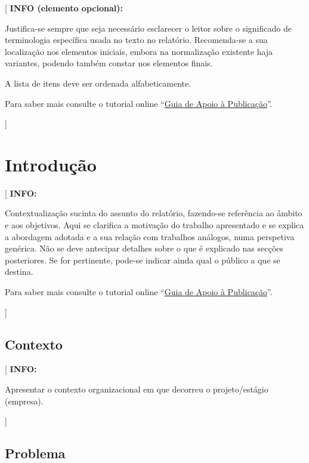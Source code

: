 \documentclass[11pt,a4paper]{report}
\newenvironment{info}[1]{\vspace*{6mm}\color{blue}[ \textbf{INFO:} \begin{em} #1}
                        {\vspace*{3mm}\end{em} ]}
\newenvironment{infoopt}[1]{\vspace*{6mm}\color{blue}[ \textbf{INFO (elemento opcional):} \begin{em} #1}
                        {\vspace*{3mm}\end{em} ]}
\begin{document}
\begin{infoopt}
Justifica-se sempre que seja necessário esclarecer o leitor sobre o
significado de terminologia específica usada no texto no relatório.
Recomenda-se a sua localização nos elementos iniciais, embora na
normalização existente haja variantes, podendo também constar nos
elementos finais.

A lista de itens deve ser ordenada alfabeticamente.

Para saber mais consulte o tutorial online 
``\href{https://docs.google.com/document/d/1TDC1behVq8x7fQL4CcPEEh_np5GXviJevQxnQ9gbiJs/edit}
{Guia de Apoio à Publicação}''.
\end{infoopt}


\chapter{Introdução}

\pagestyle{fancy}
\setcounter{page}{1}

\begin{info}
Contextualização sucinta do assunto do relatório, fazendo-se
referência ao âmbito e aos objetivos.
Aqui se clarifica a motivação do trabalho apresentado e se explica a
abordagem adotada e a sua relação com trabalhos análogos, numa
perspetiva genérica.
Não se deve antecipar detalhes sobre o que é explicado nas secções
posteriores. 
Se for pertinente, pode-se indicar ainda qual o público a que se
destina.

Para saber mais consulte o tutorial online 
``\href{https://docs.google.com/document/d/1TDC1behVq8x7fQL4CcPEEh_np5GXviJevQxnQ9gbiJs/edit}
{Guia de Apoio à Publicação}''.
\end{info}

\section{Contexto}

\begin{info}
Apresentar o contexto organizacional em que decorreu o projeto/estágio (empresa).
\end{info}

\section{Problema}
\end{document}
